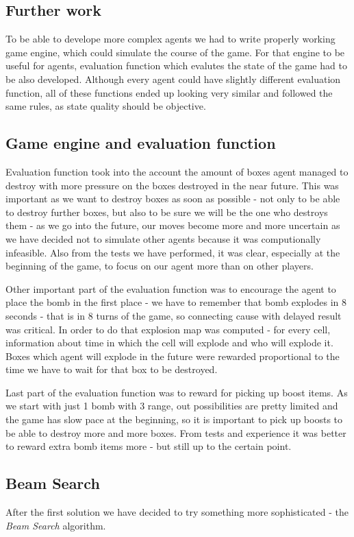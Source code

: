 \documentclass[11pt]{article}
\begin{document}
	\subsection{Further work}
	To be able to develope more complex agents we had to write properly working game engine, which could simulate the course of the game. For that engine to be useful for agents, evaluation function which evalutes the state of the game had to be also developed. Although every agent could have slightly different evaluation function, all of these functions ended up looking very similar and followed the same rules, as state quality should be objective.
	
	\subsection{Game engine and evaluation function}
	Evaluation function took into the account the amount of boxes agent managed to destroy with more pressure on the boxes destroyed in the near future. This was important as we want to destroy boxes as soon as possible - not only to be able to destroy further boxes, but also to be sure we will be the one who destroys them - as we go into the future, our moves become more and more uncertain as we have decided not to simulate other agents because it was computionally infeasible. Also from the tests we have performed, it was clear, especially at the beginning of the game, to focus on our agent more than on other players.
	
	Other important part of the evaluation function was to encourage the agent to place the bomb in the first place - we have to remember that bomb explodes in 8 seconds - that is in 8 turns of the game, so connecting cause with delayed result was critical. In order to do that explosion map was computed - for every cell, information about time in which the cell will explode and who will explode it. Boxes which agent will explode in the future were rewarded proportional to the time we have to wait for that box to be destroyed.
	
	Last part of the evaluation function was to reward for picking up boost items. As we start with just 1 bomb with 3 range, out possibilities are pretty limited and the game has slow pace at the beginning, so it is important to pick up boosts to be able to destroy more and more boxes. From tests and experience it was better to reward extra bomb items more - but still up to the certain point.
	
	\subsection{Beam Search}
	After the first solution we have decided to try something more sophisticated - the \textit{Beam Search} algorithm. 
\end{document}

